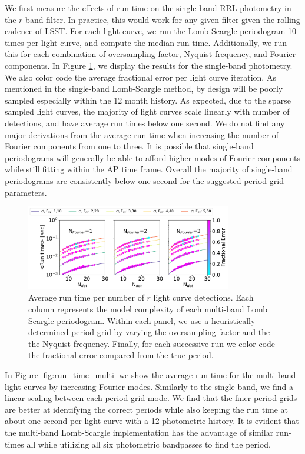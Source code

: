 \documentclass[DM,authoryear,toc]{lsstdoc}
\begin{document}
We first measure the effects of run time on the single-band RRL photometry in the $r$-band filter. In practice, this would work for any given filter given the rolling cadence of LSST. For each light curve, we run the Lomb-Scargle periodogram 10 times per light curve, and compute the median run time. Additionally, we run this for each combination of oversampling factor, Nyquist frequency, and Fourier components. In Figure \ref{fig:run_time_single}, we display the results for the single-band photometry. We also color code the average fractional error per light curve iteration. As mentioned in the single-band Lomb-Scargle method, by design will be poorly sampled especially within the 12 month history. As expected, due to the sparse sampled light curves, the majority of light curves scale linearly with number of detections, and have average run times below one second. We do not find any major derivations from the average run time when increasing the number of Fourier components from one to three. It is possible that single-band periodograms will generally be able to afford higher modes of Fourier components while still fitting within the AP time frame. Overall the majority of single-band periodograms are consistently below one second for the suggested period grid parameters. 

 
 \begin{figure}
  \includegraphics[width=0.8\textwidth]{figures/singleRUN_LSP_RRL.pdf}
  \centering 
  \caption{Average run time per number of $r$ light curve detections. Each column represents the model complexity of each multi-band Lomb Scargle periodogram. Within each panel, we use a heuristically determined period grid by varying the oversampling factor and the the Nyquist frequency.  Finally, for each successive run we color code the fractional error compared from the true period.}
  \label{fig:run_time_single}
\end{figure}

In Figure \ref{fig:run_time_multi} we show the average run time for the multi-band light curves by increasing Fourier modes. Similarly to the single-band, we find a linear scaling between each period grid mode. We find that the finer period grids are better at identifying the correct periods while also keeping the run time at about one second per light curve with a 12 photometric history. It is evident that the multi-band Lomb-Scargle implementation has the advantage of similar run-times all while utilizing all six photometric bandpasses to find the period. 
\end{document}
